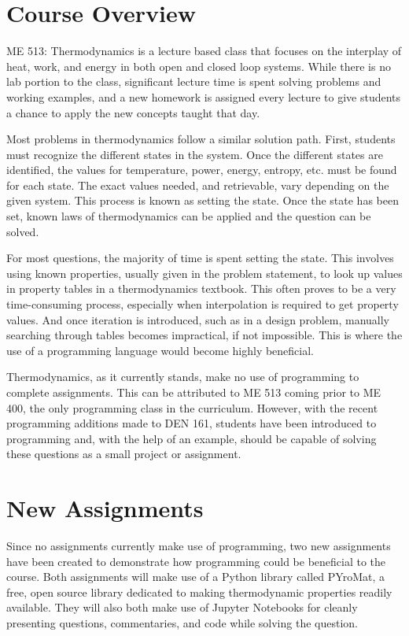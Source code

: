 \section{Course Overview}

ME 513: Thermodynamics is a lecture based class that focuses on the interplay of heat, work, and energy in both
open and closed loop systems. While there is no lab portion to the class, significant lecture time is spent
solving problems and working examples, and a new homework is assigned every lecture to give students a chance
to apply the new concepts taught that day.

Most problems in thermodynamics follow a similar solution path. First, students must recognize the different
states in the system. Once the different states are identified, the values for temperature, power, energy,
entropy, etc. must be found for each state. The exact values needed, and retrievable, vary depending on the
given system. This process is known as setting the state. Once the state has been set, known laws of
thermodynamics can be applied and the question can be solved.

For most questions, the majority of time is spent setting the state. This involves using known properties, 
usually given in the problem statement, to look up values in property tables in a thermodynamics textbook. 
This often proves to be a very time-consuming process, especially when interpolation is required to get 
property values. And once iteration is introduced, such as in a design problem, manually searching through
tables becomes impractical, if not impossible. This is where the use of a programming language would become 
highly beneficial.

Thermodynamics, as it currently stands, make no use of programming to complete assignments.
This can be attributed to ME 513 coming prior to ME 400, the only programming class in the 
curriculum. However, with the recent programming additions made to DEN 161, students have been introduced
to programming and, with the help of an example, should be capable of solving these questions as a small
project or assignment.

\section{New Assignments}

Since no assignments currently make use of programming, two new assignments have been created to demonstrate
how programming could be beneficial to the course. Both assignments will make use of a Python library called
PYroMat, a free, open source library dedicated to making thermodynamic properties readily available.
They will also both make use of Jupyter Notebooks for cleanly presenting questions, commentaries, and code
while solving the question.

